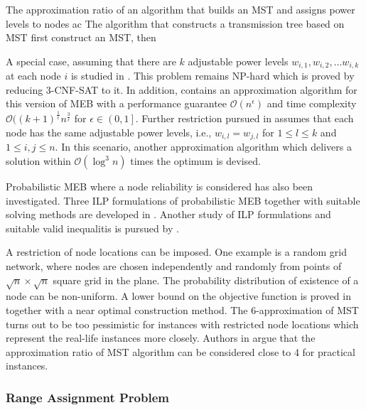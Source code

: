 The approximation ratio of an algorithm that builds an MST and assigns power levels to nodes ac
The algorithm that constructs a transmission tree based on MST first construct an MST, then 

A special case, assuming that there are $k$ adjustable power levels $w_{i,1},w_{i,2},\dots w_{i,k}$ at each node $i$ is studied in \cite{liang02}.
This problem remains NP-hard which is proved by reducing \textsc{3-CNF-SAT} to it.
In addition, \cite{liang02} contains an approximation algorithm for this version of MEB with a performance guarantee $\mathcal{O}(n^\epsilon)$ and 
time complexity $\mathcal{O}((k+1)^{\frac{1}{\epsilon}} n^{\frac{3}{\epsilon}}$ for $\epsilon\in \left(0,1\right]$.
Further restriction pursued in \cite{liang02} assumes that each node has the same adjustable power levels, i.e., $w_{i,l}=w_{j,l}$ for $1\leq l\leq k$ and $1\leq i,j\leq n$.
In this scenario, another approximation algorithm which delivers a solution within $\mathcal{O}(\log^3 n)$ times the optimum is devised.

Probabilistic MEB where a node reliability is considered has also been investigated.
Three ILP formulations of probabilistic MEB together with suitable solving methods are developed in \cite{montemanni08}.
Another study of ILP formulations and suitable valid inequalitis is pursued by \cite{barta10}.

A restriction of node locations can be imposed.
One example is a random grid network, where nodes are chosen independently and randomly from points of $\sqrt{n}\times\sqrt{n}$ square grid in the plane.
The probability distribution of existence of a node can be non-uniform.
A lower bound on the objective function is proved in \cite{calamoneri08} together with a near optimal construction method.
The 6-approximation of MST turns out to be too pessimistic for instances with restricted node locations which represent the real-life instances more closely.
Authors in \cite{flammini07} argue that the approximation ratio of MST algorithm can be considered close to 4 for practical instances.

\subsubsection{Range Assignment Problem}


